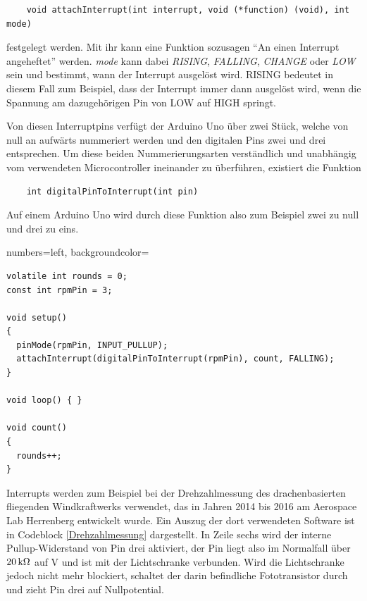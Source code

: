 \documentclass[10pt,a4paper]{article}
\begin{document}
\begin{lstlisting}
	void attachInterrupt(int interrupt, void (*function) (void), int mode)
\end{lstlisting}

festgelegt werden. Mit ihr kann eine Funktion sozusagen "`An einen Interrupt angeheftet"' werden. \emph{mode} kann dabei \emph{RISING}, \emph{FALLING}, \emph{CHANGE} oder \emph{LOW} sein und bestimmt, wann der Interrupt ausgelöst wird. RISING bedeutet in diesem Fall zum Beispiel, dass der Interrupt immer dann ausgelöst wird, wenn die Spannung am dazugehörigen Pin von LOW auf HIGH springt.

Von diesen Interruptpins verfügt der Arduino Uno über zwei Stück, welche von null an aufwärts nummeriert werden und den digitalen Pins zwei und drei entsprechen. Um diese beiden Nummerierungsarten verständlich und unabhängig vom verwendeten Microcontroller ineinander zu überführen, existiert die Funktion

\begin{lstlisting}
	int digitalPinToInterrupt(int pin)
\end{lstlisting}
Auf einem Arduino Uno wird durch diese Funktion also zum Beispiel zwei zu null und drei zu eins.
\bigskip


\clearpage
\lstset
{
	numbers=left,
	backgroundcolor=\color{white}
}
\begin{lstlisting}[caption=Ausschnitt aus dem Programmcode der kleinen Messbox, label=Drehzahlmessung] 
volatile int rounds = 0;
const int rpmPin = 3;

void setup()
{
  pinMode(rpmPin, INPUT_PULLUP);
  attachInterrupt(digitalPinToInterrupt(rpmPin), count, FALLING);
}

void loop() { }

void count()
{
  rounds++;
}
\end{lstlisting}
\vspace{0.5cm}

Interrupts werden zum Beispiel bei der Drehzahlmessung des drachenbasierten fliegenden Windkraftwerks verwendet, das in Jahren 2014 bis 2016 am Aerospace Lab Herrenberg entwickelt wurde. Ein Auszug der dort verwendeten Software ist in Codeblock \ref{Drehzahlmessung} dargestellt. In Zeile sechs wird der interne Pullup-Widerstand von Pin drei aktiviert, der Pin liegt also im Normalfall über $\unit[20]{k\Omega}$ auf \unit[5]{V} und ist mit der Lichtschranke verbunden. Wird die Lichtschranke jedoch nicht mehr blockiert, schaltet der darin befindliche Fototransistor durch und zieht Pin drei auf Nullpotential.
\end{document}
